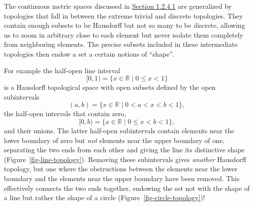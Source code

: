 \documentclass[
  letterpaper,
  DIV=11,
  numbers=noendperiod]{scrartcl}
\begin{document}
The continuous metric spaces discussed in \href{@sec:open-balls}{Section
1.2.4.1} are generalized by topologies that fall in between the extreme
trivial and discrete topologies. They contain enough subsets to be
Hausdorff but not so many to be discrete, allowing us to zoom in
arbitrary close to each element but never isolate them completely from
neighboring elements. The precise subsets included in these intermediate
topologies then endow a set a certain notions of ``shape''.

For example the half-open line interval \[
[0, 1) = \{ x \in \mathbb{R} \mid 0 \le x < 1 \}
\] is a Hausdorff topological space with open subsets defined by the
open subintervals \[
(a, b) = \{ x \in \mathbb{R} \mid 0 < a < x < b < 1 \},
\] the half-open intervals that contain zero, \[
[0, b) = \{ x \in \mathbb{R} \mid 0 \le x < b < 1 \},
\] and their unions. The latter half-open subintervals contain elements
near the lower boundary of zero but \emph{not} elements near the upper
boundary of one, separating the two ends from each other and giving the
line its distinctive shape (Figure~\ref{fig-line-topology}). Removing
these subintervals gives \emph{another} Hausdorff topology, but one
where the obstructions between the elements near the lower boundary and
the elements near the upper boundary have been removed. This effectively
connects the two ends together, endowing the set not with the shape of a
line but rather the shape of a circle
(Figure~\ref{fig-circle-topology})!
\end{document}
